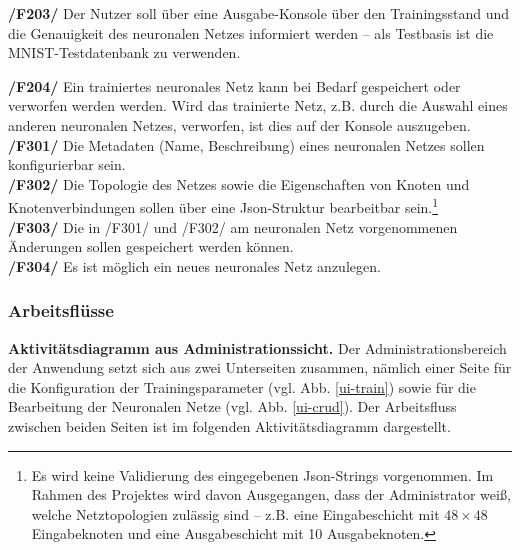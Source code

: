 \textbf{/F203/} Der Nutzer soll über eine Ausgabe-Konsole über den Trainingsstand und die Genauigkeit des neuronalen Netzes informiert werden -- als Testbasis ist die MNIST-Testdatenbank zu verwenden.

\textbf{/F204/} Ein trainiertes neuronales Netz kann bei Bedarf gespeichert oder verworfen werden werden. Wird das trainierte Netz, z.B. durch die Auswahl eines anderen neuronalen Netzes, verworfen, ist dies auf der Konsole auszugeben. \\[-0.2cm]

\textbf{/F301/} Die Metadaten (Name, Beschreibung) eines neuronalen Netzes sollen konfigurierbar sein.\\[-0.2cm]

\textbf{/F302/} Die Topologie des Netzes sowie die Eigenschaften von Knoten und Knotenverbindungen sollen über eine Json-Struktur bearbeitbar sein.\footnote{Es wird keine Validierung des eingegebenen Json-Strings vorgenommen. Im Rahmen des Projektes wird davon Ausgegangen, dass der Administrator weiß, welche Netztopologien zulässig sind -- z.B. eine Eingabeschicht mit $48 \times 48$ Eingabeknoten und eine Ausgabeschicht mit 10 Ausgabeknoten.}\\[-0.2cm]

\textbf{/F303/} Die in /F301/ und /F302/ am neuronalen Netz vorgenommenen Änderungen sollen gespeichert werden können.\\[-0.2cm]

\textbf{/F304/} Es ist möglich ein neues neuronales Netz anzulegen.

\newpage
\subsubsection{Arbeitsflüsse}

\textbf{Aktivitätsdiagramm aus Administrationssicht.} Der Administrationsbereich der Anwendung setzt sich aus zwei Unterseiten zusammen, nämlich einer Seite für die Konfiguration der Trainingsparameter (vgl. Abb. \ref{ui-train}) sowie für die Bearbeitung der Neuronalen Netze (vgl. Abb. \ref{ui-crud}). Der Arbeitsfluss zwischen beiden Seiten ist im folgenden Aktivitätsdiagramm dargestellt.

